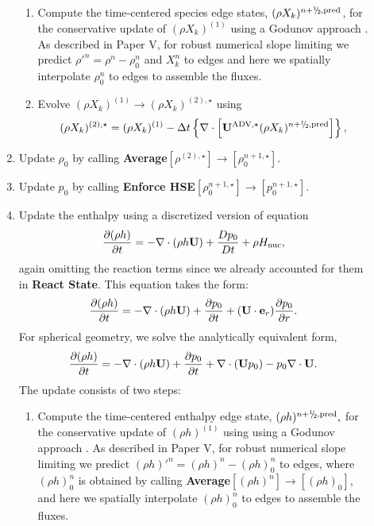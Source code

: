 \begin{description}
\begin{enumerate}
\begin{enumerate}
\item Compute the time-centered species edge states, $(\rho X_k)^{\nph,\pred}$,
  for the conservative update of $(\rho X_k)^{(1)}$ using a Godunov approach \citep{XRB_III}.
  As described in Paper V, for robust numerical slope limiting we predict 
  $\rho'^n=\rho^n-\rho_0^n$ and $X_k^n$ to edges
  and here we spatially interpolate $\rho_0^n$ to edges to assemble the fluxes.

\item Evolve $(\rho X_k)^{(1)} \rightarrow (\rho X_k)^{(2),\star}$ using
\begin{equation}
(\rho X_k)^{(2),\star} = (\rho X_k)^{(1)}
  - \dt \left\{ \nabla \cdot \left[ \uadvone (\rho X_k)^{\nph,\pred} \right] \right\},
\end{equation}

\end{enumerate}

\item Update $\rho_0$ by calling {\bf Average}$[\rho^{(2),\star}]\rightarrow[\rho_0^{n+1,\star}]$.

\item Update $p_0$ by calling {\bf Enforce HSE}$[\rho_0^{n+1,\star}] \rightarrow [p_0^{n+1,\star}]$.

\item Update the enthalpy using a discretized version of equation
%
\begin{equation}
\frac{\partial(\rho h)}{\partial t} = -\nabla\cdot(\rho h\Ub) + \frac{Dp_0}{Dt} + \rho\Hnuc,
\end{equation}
%
again omitting the reaction terms since we already accounted for
them in {\bf React State}.  This equation takes the form:
\begin{equation}
\frac{\partial (\rho h)}{\partial t}  = - \nabla \cdot (\rho h\Ub) + \frac{\partial p_0}{\partial t} + (\Ub \cdot \eb_r) \frac{\partial p_0}{\partial r}.
\end{equation}
For spherical geometry, we solve the analytically equivalent form,
\begin{equation}
\frac{\partial (\rho h)}{\partial t}  = - \nabla \cdot (\rho h\Ub) + \frac{\partial p_0}{\partial t} + \nabla \cdot (\Ub p_0) - p_0 \nabla \cdot \Ub.
\end{equation}
The update consists of two steps:

\begin{enumerate}
\renewcommand{\labelenumii}{{\bf \roman{enumii}}.}

\item Compute the time-centered enthalpy edge state, $(\rho h)^{\nph,\pred},$
  for the conservative update of $(\rho h)^{(1)}$ using using a Godunov approach \citep{XRB_III}.
  As described in Paper V, for robust numerical slope limiting 
  we predict $(\rho h)'^n=(\rho h)^n-(\rho h)_0^n$ to edges,
  where $(\rho h)_0^n$ is obtained by calling {\bf Average}$[(\rho h)^n]\rightarrow[(\rho h)_0]$,
  and here we spatially interpolate $(\rho h)_0^n$ to edges to assemble the fluxes.


\end{enumerate}
\end{enumerate}
\end{description}
